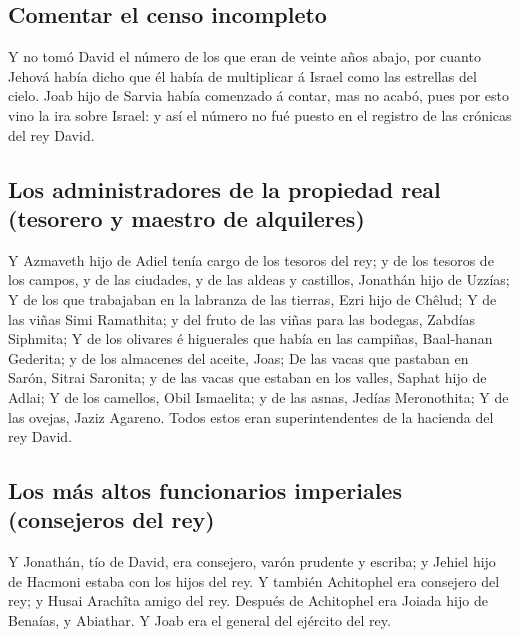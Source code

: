 \hypertarget{comentar-el-censo-incompleto}{%
\subsection{Comentar el censo
incompleto}\label{comentar-el-censo-incompleto}}

 Y no tomó David el número de los que eran de veinte años
abajo, por cuanto Jehová había dicho que él había de multiplicar á
Israel como las estrellas del cielo.  Joab hijo de Sarvia
había comenzado á contar, mas no acabó, pues por esto vino la ira sobre
Israel: y así el número no fué puesto en el registro de las crónicas del
rey David.

\hypertarget{los-administradores-de-la-propiedad-real-tesorero-y-maestro-de-alquileres}{%
\subsection{Los administradores de la propiedad real (tesorero y maestro
de
alquileres)}\label{los-administradores-de-la-propiedad-real-tesorero-y-maestro-de-alquileres}}

 Y Azmaveth hijo de Adiel tenía cargo de los tesoros del
rey; y de los tesoros de los campos, y de las ciudades, y de las aldeas
y castillos, Jonathán hijo de Uzzías;  Y de los que
trabajaban en la labranza de las tierras, Ezri hijo de Chêlud;
 Y de las viñas Simi Ramathita; y del fruto de las viñas
para las bodegas, Zabdías Siphmita;  Y de los olivares é
higuerales que había en las campiñas, Baal-hanan Gederita; y de los
almacenes del aceite, Joas;  De las vacas que pastaban en
Sarón, Sitrai Saronita; y de las vacas que estaban en los valles, Saphat
hijo de Adlai;  Y de los camellos, Obil Ismaelita; y de las
asnas, Jedías Meronothita;  Y de las ovejas, Jaziz Agareno.
Todos estos eran superintendentes de la hacienda del rey David.

\hypertarget{los-muxe1s-altos-funcionarios-imperiales-consejeros-del-rey}{%
\subsection{Los más altos funcionarios imperiales (consejeros del
rey)}\label{los-muxe1s-altos-funcionarios-imperiales-consejeros-del-rey}}

 Y Jonathán, tío de David, era consejero, varón prudente y
escriba; y Jehiel hijo de Hacmoni estaba con los hijos del rey.
 Y también Achitophel era consejero del rey; y Husai
Arachîta amigo del rey.  Después de Achitophel era Joiada
hijo de Benaías, y Abiathar. Y Joab era el general del ejército del rey.

